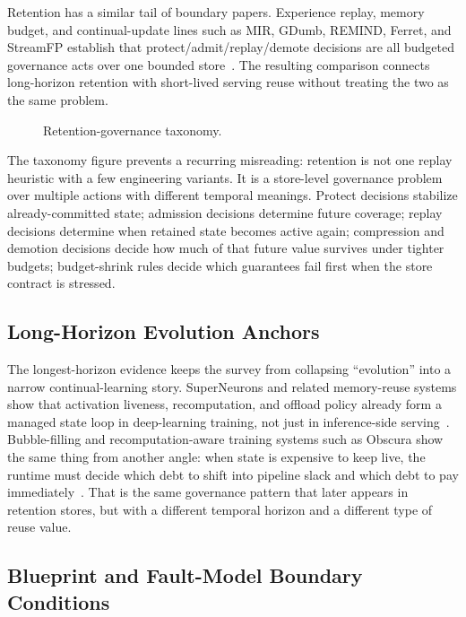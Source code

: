 Retention has a similar tail of boundary papers. Experience replay, memory budget, and continual-update lines such as MIR, GDumb, REMIND, Ferret, and StreamFP establish that protect/admit/replay/demote decisions are all budgeted governance acts over one bounded store~\cite{aljundi2019mir,prabhu2020gdumb,hayes2020remind,zhou2025ferret,li2026streamfp}. The resulting comparison connects long-horizon retention with short-lived serving reuse without treating the two as the same problem.

\begin{figure}[t]
\centering
\resizebox{0.94\textwidth}{!}{}
\caption{Retention-governance taxonomy.}
\label{fig:supp-retention-taxonomy}
\end{figure}

The taxonomy figure prevents a recurring misreading: retention is not one replay heuristic with a few engineering variants. It is a store-level governance problem over multiple actions with different temporal meanings. Protect decisions stabilize already-committed state; admission decisions determine future coverage; replay decisions determine when retained state becomes active again; compression and demotion decisions decide how much of that future value survives under tighter budgets; budget-shrink rules decide which guarantees fail first when the store contract is stressed.

\subsection{Long-Horizon Evolution Anchors}

The longest-horizon evidence keeps the survey from collapsing ``evolution'' into a narrow continual-learning story. SuperNeurons and related memory-reuse systems show that activation liveness, recomputation, and offload policy already form a managed state loop in deep-learning training, not just in inference-side serving~\cite{wang2018superneurons}. Bubble-filling and recomputation-aware training systems such as Obscura show the same thing from another angle: when state is expensive to keep live, the runtime must decide which debt to shift into pipeline slack and which debt to pay immediately~\cite{huang2025obscura}. That is the same governance pattern that later appears in retention stores, but with a different temporal horizon and a different type of reuse value.

\subsection{Blueprint and Fault-Model Boundary Conditions}

